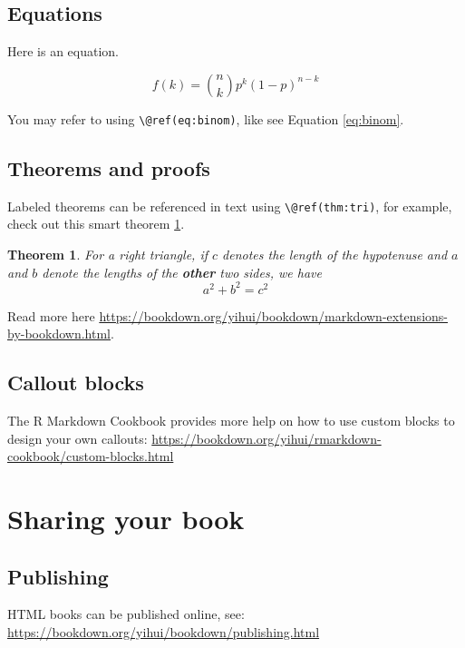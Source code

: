 \documentclass[
]{book}
\newtheorem{theorem}{Theorem}[chapter]
\theoremstyle{definition}
\theoremstyle{definition}
\theoremstyle{definition}
\theoremstyle{definition}
\theoremstyle{remark}
\begin{document}
\section{Equations}\label{equations}

Here is an equation.

\begin{equation} 
  f\left(k\right) = \binom{n}{k} p^k\left(1-p\right)^{n-k}
  \label{eq:binom}
\end{equation}

You may refer to using \texttt{\textbackslash{}@ref(eq:binom)}, like see Equation \eqref{eq:binom}.

\section{Theorems and proofs}\label{theorems-and-proofs}

Labeled theorems can be referenced in text using \texttt{\textbackslash{}@ref(thm:tri)}, for example, check out this smart theorem \ref{thm:tri}.

\begin{theorem}
\protect\hypertarget{thm:tri}{}\label{thm:tri}For a right triangle, if \(c\) denotes the \emph{length} of the hypotenuse
and \(a\) and \(b\) denote the lengths of the \textbf{other} two sides, we have
\[a^2 + b^2 = c^2\]
\end{theorem}

Read more here \url{https://bookdown.org/yihui/bookdown/markdown-extensions-by-bookdown.html}.

\section{Callout blocks}\label{callout-blocks}

The R Markdown Cookbook provides more help on how to use custom blocks to design your own callouts: \url{https://bookdown.org/yihui/rmarkdown-cookbook/custom-blocks.html}

\chapter{Sharing your book}\label{sharing-your-book}

\section{Publishing}\label{publishing}

HTML books can be published online, see: \url{https://bookdown.org/yihui/bookdown/publishing.html}
\end{document}

